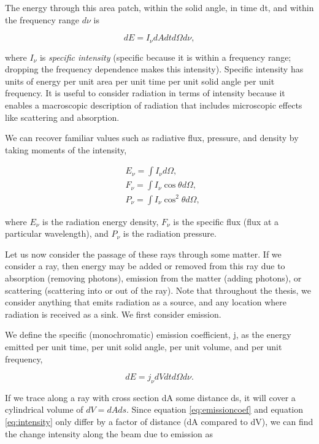 The energy through this area patch, within the solid angle, in time dt, and within the frequency range $d\nu$ is

\begin{equation}
\label{eq:intensity}
dE = I_{\nu}dA dt d\Omega d\nu,
\end{equation}

\noindent
where $I_{\nu}$ is \emph{specific intensity} (specific because it is within a frequency range; dropping the frequency dependence makes this intensity). Specific intensity has units of energy per unit area per unit time per unit solid angle per unit frequency. It is useful to consider radiation in terms of intensity because it enables a macroscopic description of radiation that includes microscopic effects like scattering and absorption.

We can recover familiar values such as radiative flux, pressure, and density by taking moments of the intensity,

\begin{align}
&E_{\nu} = \int I_{\nu}d\Omega,\nonumber\\
&F_{\nu} = \int I_{\nu}\cos{\theta}d\Omega, \label{eq:moments}\\
&P_{\nu} = \int I_{\nu}\cos^2{\theta}d\Omega,\nonumber
\end{align}

\noindent
where $E_{\nu}$ is the radiation energy density, $F_{\nu}$ is the specific flux (flux at a particular wavelength), and $P_{\nu}$ is the radiation pressure.

Let us now consider the passage of these rays through some matter. If we consider a ray, then energy may be added or removed from this ray due to absorption (removing photons), emission from the matter (adding photons), or scattering (scattering into or out of the ray). Note that throughout the thesis, we consider anything that emits radiation as a source, and any location where radiation is received as a sink. We first consider emission.

We define the specific (monochromatic) emission coefficient, j, as the energy emitted per unit time, per unit solid angle, per unit volume, and per unit frequency,

\begin{equation}
\label{eq:emissioncoef}
dE = j_{\nu} dV dt d\Omega d\nu.
\end{equation}

If we trace along a ray with cross section dA some distance ds, it will cover a cylindrical volume of $dV = dA ds$. Since equation \ref{eq:emissioncoef} and equation \ref{eq:intensity} only differ by a factor of distance (dA compared to dV), we can find the change intensity along the beam due to emission as

